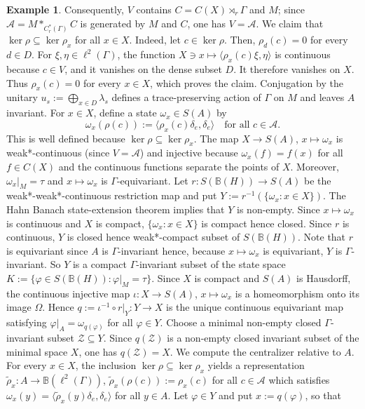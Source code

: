\documentclass[12pt]{amsart} %
\theoremstyle{plain}
\theoremstyle{definition}
\newtheorem{example}[theorem]{Example}
\begin{document}
\begin{example}
Consequently, $V$ contains $C=C(X)\rtimes_r\Gamma$ and $M$; since
$\mathcal A=M*_{C_r^*(\Gamma)}C$ is generated by $M$ and $C$, one has
$V=\mathcal A$.
\medskip
\noindent We claim that $\ker\rho\subseteq\ker\rho_x$ for all $x\in X$. Indeed, let $c\in\ker\rho$. Then,
$\rho_d(c)=0$ for every $d\in D$. For $\xi,\eta\in\ell^2(\Gamma)$, the
function $X\ni x\longmapsto\langle\rho_x(c)\xi,\eta\rangle$ is continuous because $c\in V$, and it vanishes on the dense subset $D$.
It therefore vanishes on $X$. Thus $\rho_x(c)=0$ for every $x\in X$, which
proves the claim.
\medskip
\noindent Conjugation by the unitary $u_s:=\bigoplus_{x\in D}\lambda_s$ defines a trace-preserving action of $\Gamma$ on $M$ and leaves $A$
invariant. For $x\in X$, define a state $\omega_x\in S(A)$ by
$$\omega_x(\rho(c)):=\langle\rho_x(c)\delta_e,\delta_e\rangle\quad \text{for all }c\in\mathcal A.$$
This is well defined because $\ker\rho\subseteq\ker\rho_x$. The map
$X\to S(A)$, $x\mapsto\omega_x$ is weak*-continuous (since $V=\mathcal{A}$) and injective because $\omega_x(f)=f(x)$ for all $f\in C(X)$ and the continuous functions separate the points of $X$. Moreover,
$\omega_x|_M=\tau$ and $x\mapsto\omega_x$ is $\Gamma$-equivariant.
\medskip
\noindent Let $r:S(\mathbb B(H))\to S(A)$ be the weak*-weak*-continuous restriction map and put $Y:=r^{-1}(\{\omega_x:x\in X\})$. The Hahn Banach state-extension theorem implies that $Y$ is non-empty. Since $x\mapsto\omega_x$ is continuous and $X$ is compact, $\{\omega_x:x\in X\}$ is compact hence closed. Since $r$ is continuous, $Y$ is closed hence weak*-compact subset of $S(\mathbb B(H))$. Note that $r$ is equivariant since $A$ is $\Gamma$-invariant hence, because $x\mapsto\omega_x$ is equivariant, $Y$ is $\Gamma$-invariant. So $Y$ is a 
compact $\Gamma$-invariant subset of the state space $K:=\{\varphi\in S(\mathbb B(H)):\varphi|_M=\tau\}$. Since $X$ is compact and $S(A)$ is Hausdorff, the continuous injective map $\iota:X\to S(A)$, $x\mapsto\omega_x$ is a homeomorphism onto its image $\Omega$. Hence $q:=\iota^{-1}\circ r|_Y:Y\to X$ is the unique continuous equivariant map satisfying $\varphi|_A=\omega_{q(\varphi)}$ for all $\varphi\in Y$. Choose a minimal non-empty closed $\Gamma$-invariant subset
$\mathcal Z\subseteq Y$. Since $q(\mathcal Z)$ is a non-empty closed
invariant subset of the minimal space $X$, one has $q(\mathcal Z)=X$.
\medskip
\noindent We compute the centralizer relative to $A$. For every $x\in X$,
the inclusion $\ker\rho\subseteq\ker\rho_x$ yields a representation $\widetilde\rho_x:A\to\mathbb B(\ell^2(\Gamma))$, $\widetilde\rho_x(\rho(c)):=\rho_x(c)$ for all $c\in\mathcal A$ which satisfies $\omega_x(y)=\langle\widetilde\rho_x(y)\delta_e,\delta_e\rangle$ for all $y\in A$. Let $\varphi\in Y$ and put $x:=q(\varphi)$, so that

\end{example}
\end{document}
